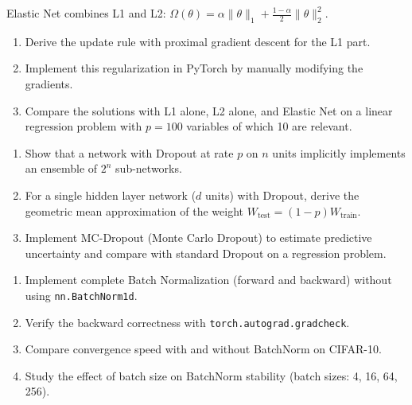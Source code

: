 \begin{exercise}
Elastic Net combines L1 and L2:
$\Omega(\theta) = \alpha \|\theta\|_1 + \frac{1-\alpha}{2}\|\theta\|_2^2$.
\begin{enumerate}
  \item Derive the update rule with proximal gradient descent for the L1 part.
  \item Implement this regularization in PyTorch by manually modifying
    the gradients.
  \item Compare the solutions with L1 alone, L2 alone, and Elastic Net on a
    linear regression problem with $p = 100$ variables of which 10 are
    relevant.
\end{enumerate}
\end{exercise}

\begin{exercise}
\begin{enumerate}
  \item Show that a network with Dropout at rate $p$ on $n$ units
    implicitly implements an ensemble of $2^n$ sub-networks.
  \item For a single hidden layer network ($d$ units) with Dropout,
    derive the geometric mean approximation of the weight
    $W_{\text{test}} = (1-p) W_{\text{train}}$.
  \item Implement MC-Dropout (Monte Carlo Dropout) to estimate
    predictive uncertainty and compare with standard Dropout on a
    regression problem.
\end{enumerate}
\end{exercise}

\begin{exercise}
\begin{enumerate}
  \item Implement complete Batch Normalization (forward and backward)
    without using \texttt{nn.BatchNorm1d}.
  \item Verify the backward correctness with \texttt{torch.autograd.gradcheck}.
  \item Compare convergence speed with and without BatchNorm on CIFAR-10.
  \item Study the effect of batch size on BatchNorm stability
    (batch sizes: 4, 16, 64, 256).
\end{enumerate}
\end{exercise}

